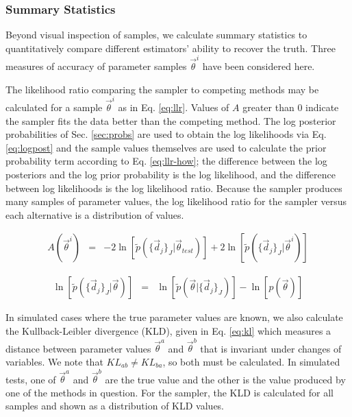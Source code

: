 \documentclass[preprint]{aastex}
\begin{document}
\clearpage
\subsubsection{Summary Statistics}
\label{sec:stats}

Beyond visual inspection of samples, we calculate summary statistics to quantitatively compare different estimators' ability to recover the truth.  Three measures of accuracy of parameter samples $\vec{\theta}^{i}$  have been considered here.  

The likelihood ratio comparing the sampler to competing methods may be calculated for a sample $\vec{\theta}^{i}$ as in Eq. \ref{eq:llr}.  Values of $A$ greater than 0 indicate the sampler fits the data better than the competing method.  The log posterior probabilities of Sec. \ref{sec:probs} are used to obtain the log likelihoods via Eq. \ref{eq:logpost} and the sample values themselves are used to calculate the prior probability term according to Eq. \ref{eq:llr-how}; the difference between the log posteriors and the log prior probability is the log likelihood, and the difference between log likelihoods is the log likelihood ratio.  Because the sampler produces many samples of parameter values, the log likelihood ratio for the sampler versus each alternative is a distribution of values.

\begin{eqnarray}
\label{eq:llr}
A(\vec{\theta}^{i}) &=& -2\ln[\tilde{p}(\{\vec{d}_{j}\}_{J}|\vec{\theta}_{test})]+2\ln[\tilde{p}(\{\vec{d}_{j}\}_{J}|\vec{\theta}^{i})]
\end{eqnarray}

\begin{eqnarray}
\label{eq:llr-how}
\ln[\tilde{p}(\{\vec{d}_{j}\}_{J}|\vec{\theta})] &=& \ln[\tilde{p}(\vec{\theta}|\{\vec{d}_{j}\}_{J})]-\ln[p(\vec{\theta})]
\end{eqnarray}

In simulated cases where the true parameter values are known, we also calculate the Kullback-Leibler divergence (KLD), given in Eq. \ref{eq:kl} which measures a distance between parameter values $\vec{\theta}^{a}$ and $\vec{\theta}^{b}$ that is invariant under changes of variables.  We note that $KL_{ab}\neq KL_{ba}$, so both must be calculated.  In simulated tests, one of $\vec{\theta}^{a}$ and $\vec{\theta}^{b}$ are the true value and the other is the value produced by one of the methods in question.  For the sampler, the KLD is calculated for all samples and shown as a distribution of KLD values.
\end{document}
